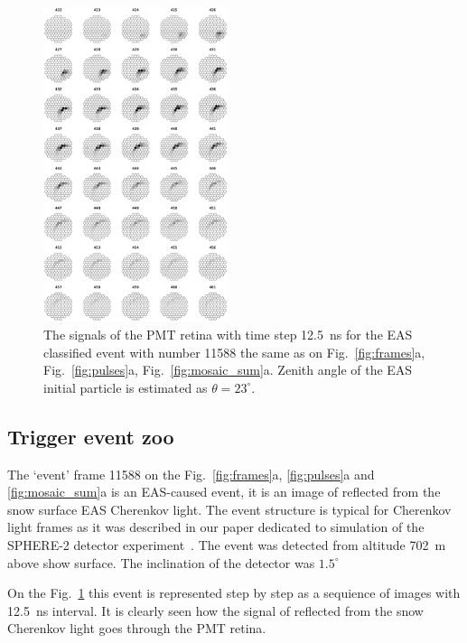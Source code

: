 \documentclass[final,5p,times,twocolumn]{elsarticle}
\begin{document}
\begin{figure}[bt]
    \centering
    \includegraphics[width=0.48\textwidth]{figs/retina_11588_lin.eps}%
    \caption{The signals of the PMT retina with time step 12.5~ns for the EAS classified event with number 11588 the same as on Fig.~\ref{fig:frames}a, Fig.~\ref{fig:pulses}a, Fig.~\ref{fig:mosaic_sum}a. Zenith angle of the EAS initial particle is estimated as $\theta = 23^{\circ}$. %
    }
    \label{fig:retina_eas}
\end{figure}


\subsection{Trigger event zoo}

The `event' frame 11588 on the Fig.~\ref{fig:frames}a, \ref{fig:pulses}a and \ref{fig:mosaic_sum}a is an EAS-caused event, it is an image of reflected from the snow surface EAS Cherenkov light. The event structure is typical for Cherenkov light frames as it was described in our paper dedicated to simulation of the SPHERE-2 detector experiment~\cite{ant19}. The event was detected from altitude 702~m above show surface. The inclination of the detector was $1.5^{\circ}$

On the Fig.~\ref{fig:retina_eas} this event is represented step by step as a sequience of images with 12.5~ns interval. It is clearly seen how the signal of reflected from the snow Cherenkov light goes through the PMT retina.
\end{document}
